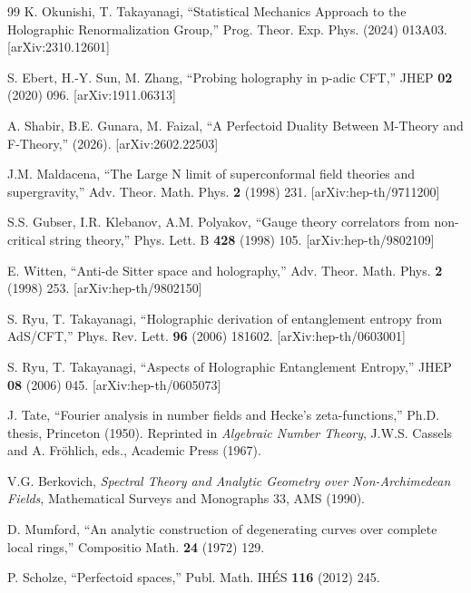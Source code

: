 \documentclass[11pt,a4paper]{article}
\begin{document}
\begin{thebibliography}{99}
 K. Okunishi, T. Takayanagi, ``Statistical Mechanics Approach to the Holographic Renormalization Group,'' Prog. Theor. Exp. Phys. (2024) 013A03. [arXiv:2310.12601]

 S. Ebert, H.-Y. Sun, M. Zhang, ``Probing holography in p-adic CFT,'' JHEP \textbf{02} (2020) 096. [arXiv:1911.06313]

 A. Shabir, B.E. Gunara, M. Faizal, ``A Perfectoid Duality Between M-Theory and F-Theory,'' (2026). [arXiv:2602.22503]


 J.M. Maldacena, ``The Large N limit of superconformal field theories and supergravity,'' Adv. Theor. Math. Phys. \textbf{2} (1998) 231. [arXiv:hep-th/9711200]

 S.S. Gubser, I.R. Klebanov, A.M. Polyakov, ``Gauge theory correlators from non-critical string theory,'' Phys. Lett. B \textbf{428} (1998) 105. [arXiv:hep-th/9802109]

 E. Witten, ``Anti-de Sitter space and holography,'' Adv. Theor. Math. Phys. \textbf{2} (1998) 253. [arXiv:hep-th/9802150]

 S. Ryu, T. Takayanagi, ``Holographic derivation of entanglement entropy from AdS/CFT,'' Phys. Rev. Lett. \textbf{96} (2006) 181602. [arXiv:hep-th/0603001]

 S. Ryu, T. Takayanagi, ``Aspects of Holographic Entanglement Entropy,'' JHEP \textbf{08} (2006) 045. [arXiv:hep-th/0605073]


 J. Tate, ``Fourier analysis in number fields and Hecke's zeta-functions,'' Ph.D. thesis, Princeton (1950). Reprinted in \emph{Algebraic Number Theory}, J.W.S. Cassels and A. Fr\"ohlich, eds., Academic Press (1967).

 V.G. Berkovich, \emph{Spectral Theory and Analytic Geometry over Non-Archimedean Fields}, Mathematical Surveys and Monographs 33, AMS (1990).

 D. Mumford, ``An analytic construction of degenerating curves over complete local rings,'' Compositio Math. \textbf{24} (1972) 129.

 P. Scholze, ``Perfectoid spaces,'' Publ. Math. IH\'ES \textbf{116} (2012) 245.

\end{thebibliography}
\end{document}

